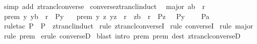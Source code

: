 \begin{isabellebody}
\ {\isacharparenleft}simp\ add{\isacharcolon}\ ztrancl{\isacharunderscore}converse{\isacharparenright}\isanewline
{}\isamarkupfalse%
%
\endisatagproof
{\isafoldproof}%
%
\isadelimproof
\isanewline
%
\endisadelimproof
\isanewline
{}\isamarkupfalse%
\ converse{\isacharunderscore}ztrancl{\isacharunderscore}induct{\isacharcolon}\ \isanewline
{}\ major{\isacharcolon}\ {\isachardoublequoteopen}{\isacharparenleft}a{\isacharcomma}b{\isacharparenright}\ {\isacharcolon}\ r{\isacharpercent}{\isacharplus}{\isachardoublequoteclose}\isanewline
{}\ prem{}{\isacharcolon}\ {\isachardoublequoteopen}{\isacharbang}{\isacharbang}y{\isachardot}\ {\isacharparenleft}y{\isacharcomma}b{\isacharparenright}\ {\isacharcolon}\ r\ {\isacharequal}{\isacharequal}{\isachargreater}\ P{\isacharparenleft}y{\isacharparenright}{\isachardoublequoteclose}\ \ \isanewline
{}\ prem{}{\isacharcolon}\ {\isachardoublequoteopen}{\isacharbang}{\isacharbang}y\ z{\isachardot}{\isacharbrackleft}{\isacharbar}\ {\isacharparenleft}y{\isacharcomma}z{\isacharparenright}\ {\isacharcolon}\ r{\isacharsemicolon}\ \ {\isacharparenleft}z{\isacharcomma}b{\isacharparenright}\ {\isacharcolon}\ r{\isacharpercent}{\isacharplus}{\isacharsemicolon}\ \ P{\isacharparenleft}z{\isacharparenright}\ {\isacharbar}{\isacharbrackright}\ {\isacharequal}{\isacharequal}{\isachargreater}\ P{\isacharparenleft}y{\isacharparenright}{\isachardoublequoteclose}\ \ \ \isanewline
{}\ {\isachardoublequoteopen}P{\isacharparenleft}a{\isacharparenright}{\isachardoublequoteclose}\isanewline
%
\isadelimproof
%
\endisadelimproof
%
\isatagproof
{}\isamarkupfalse%
\ {\isacharparenleft}rule{\isacharunderscore}tac\ P\ {\isacharequal}\ {\isachardoublequoteopen}P{\isachardoublequoteclose}\ \ ztrancl{\isacharunderscore}induct{\isacharparenright}\isanewline
{}\isamarkupfalse%
\ {\isacharparenleft}rule\ ztrancl{\isacharunderscore}converseI{\isacharparenright}\isanewline
{}\isamarkupfalse%
\ {\isacharparenleft}rule\ converseI{\isacharparenright}\isanewline
{}\isamarkupfalse%
\ {\isacharparenleft}rule\ major{\isacharparenright}\isanewline
{}\isamarkupfalse%
\ {\isacharparenleft}rule\ prem{}{\isacharparenright}\isanewline
{}\isamarkupfalse%
\ {\isacharparenleft}erule\ converseD{\isacharparenright}\isanewline
{}\isamarkupfalse%
\ {\isacharparenleft}blast\ intro{\isacharcolon}\ prem{}\ prem{}\ dest{\isacharbang}{\isacharcolon}\ ztrancl{\isacharunderscore}converseD{\isacharparenright}\isanewline

\end{isabellebody}
